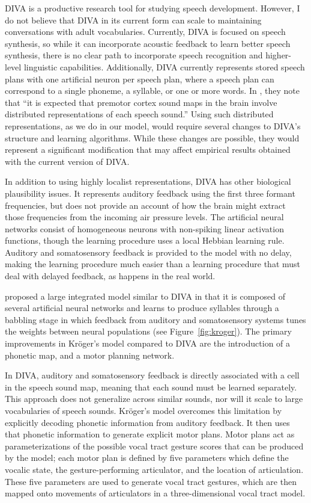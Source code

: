 {DIVA is a productive research tool
for studying speech development.
However, I do not believe that DIVA
in its current form
can scale to maintaining conversations
with adult vocabularies.
Currently, DIVA is focused on speech synthesis,
so while it can incorporate acoustic feedback
to learn better speech synthesis,
there is no clear path
to incorporate speech recognition
and higher-level linguistic capabilities.
Additionally, DIVA currently represents
stored speech plans with one artificial
neuron per speech plan,
where a speech plan can correspond to
a single phoneme, a syllable, or one or more words.
In \citet{guenther2006a},
they note that ``it is expected that
premotor cortex sound maps in the brain
involve distributed representations
of each speech sound.''
Using such distributed representations,
as we do in our model,
would require several changes to DIVA's
structure and learning algorithms.
While these changes are possible,
they would represent a significant
modification that may affect
empirical results obtained
with the current version of DIVA.

In addition to using highly localist representations,
DIVA has other biological plausibility issues.
It represents auditory feedback using the first
three formant frequencies,
but does not provide an account of
how the brain might extract those
frequencies from the incoming air pressure levels.
The artificial neural networks
consist of homogeneous neurons
with non-spiking linear activation functions,
though the learning procedure
uses a local Hebbian learning rule.
Auditory and somatosensory feedback
is provided to the model with no delay,
making the learning procedure
much easier than a learning procedure
that must deal with delayed feedback,
as happens in the real world.

\citet{kroger2009} proposed
a large integrated model
similar to DIVA in that
it is composed of
several artificial neural networks
and learns to produce syllables
through a babbling stage
in which feedback from
auditory and somatosensory systems
tunes the weights between
neural populations
(see Figure~\ref{fig:kroger}).
The primary improvements in
Kr\"{o}ger's model compared to DIVA
are the introduction of a phonetic map,
and a motor planning network.


In DIVA, auditory and somatosensory feedback
is directly associated with a cell
in the speech sound map,
meaning that each sound must be learned separately.
This approach does not generalize across
similar sounds, nor will it scale
to large vocabularies of speech sounds.
Kr\"{o}ger's model overcomes this limitation
by explicitly decoding phonetic information
from auditory feedback.
It then uses that phonetic information
to generate explicit motor plans.
Motor plans act as parameterizations
of the possible vocal tract gesture scores
that can be produced by the model;
each motor plan is defined by
five parameters which define
the vocalic state,
the gesture-performing articulator,
and the location of articulation.
These five parameters are used
to generate vocal tract gestures,
which are then mapped onto
movements of articulators
in a three-dimensional vocal tract model.

}
